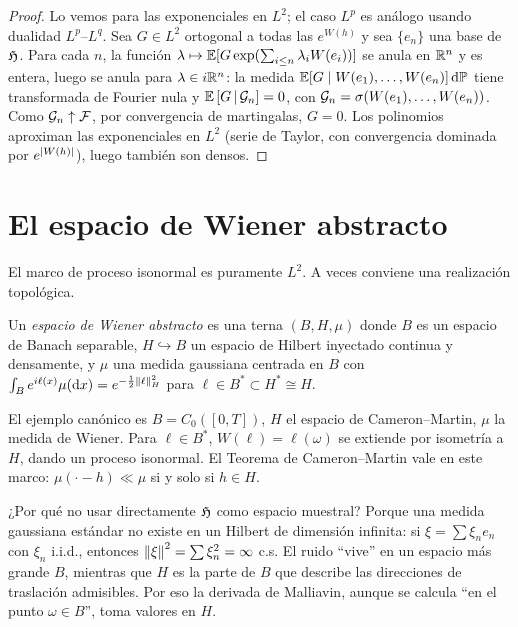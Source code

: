 \begin{proof}
Lo vemos para las exponenciales en $L^2$; el caso $L^p$ es análogo usando dualidad
$L^p$--$L^q$. Sea $G\in L^2$ ortogonal a todas las $e^{W(h)}$ y sea $\{e_n\}$ una base de $\mathfrak{H}$. Para cada $n$, la
función $\lambda\mapsto\mathbb{E}[G\exp(\sum_{i\le n}\lambda_iW(e_i))]$ se anula en $\mathbb{R}^n$ y es entera, luego se anula para $\lambda\in i\mathbb{R}^n$:
la medida $\mathbb{E}[G\mid W(e_1),\dots,W(e_n)]\,\mathrm{d}\mathbb{P}$ tiene transformada de Fourier nula y $\mathbb{E}\left[G\,\middle|\,\mathcal{G}_n\right]=0$,
con $\mathcal{G}_n=\sigma(W(e_1),\dots,W(e_n))$. Como $\mathcal{G}_n\uparrow\mathcal{F}$, por convergencia de martingalas, $G=0$. Los
polinomios aproximan las exponenciales en $L^2$ (serie de Taylor, con convergencia dominada por
$e^{\left\lvert W(h)\right\rvert}$), luego también son densos.
\end{proof}

\section{El espacio de Wiener abstracto}
El marco de proceso isonormal es puramente $L^2$. A veces conviene una realización topológica.

\begin{definicion}
Un \emph{espacio de Wiener abstracto} es una terna $(B,H,\mu)$ donde $B$ es un espacio
de Banach separable, $H\hookrightarrow B$ un espacio de Hilbert inyectado continua y densamente, y $\mu$
una medida gaussiana centrada en $B$ con $\int_Be^{i\ell(x)}\mu(\mathrm{d} x)=e^{-\frac12\left\lVert \ell\right\rVert_H^2}$ para $\ell\in B^*\subset H^*\cong H$.
\end{definicion}

El ejemplo canónico es $B=C_0([0,T])$, $H$ el espacio de Cameron--Martin, $\mu$ la medida de
Wiener. Para $\ell\in B^*$, $W(\ell)=\ell(\omega)$ se extiende por isometría a $H$, dando un proceso isonormal.
El Teorema de Cameron--Martin vale en este marco: $\mu(\cdot-h)\ll\mu$ si y solo si $h\in H$.

\begin{intuicion}
¿Por qué no usar directamente $\mathfrak{H}$ como espacio muestral? Porque una medida gaussiana
estándar no existe en un Hilbert de dimensión infinita: si $\xi=\sum\xi_ne_n$ con $\xi_n$ i.i.d., entonces
$\left\lVert \xi\right\rVert^2=\sum\xi_n^2=\infty$ c.s. El ruido ``vive'' en un espacio más grande $B$, mientras que $H$ es la
parte de $B$ que describe las direcciones de traslación admisibles. Por eso la derivada de
Malliavin, aunque se calcula ``en el punto $\omega\in B$'', toma valores en $H$.
\end{intuicion}
